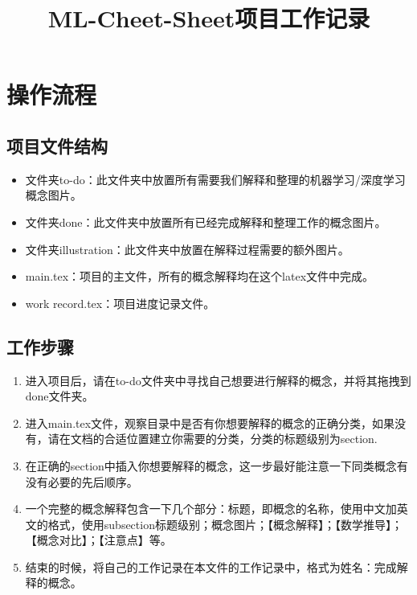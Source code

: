 \documentclass[a4paper,12pt]{article}
\title{ML-Cheet-Sheet项目工作记录}
\begin{document}
\maketitle

\section{操作流程}
\subsection{项目文件结构}
\begin{itemize}
    \item 文件夹to-do：此文件夹中放置所有需要我们解释和整理的机器学习/深度学习概念图片。
    \item 文件夹done：此文件夹中放置所有已经完成解释和整理工作的概念图片。
    \item 文件夹illustration：此文件夹中放置在解释过程需要的额外图片。
    \item main.tex：项目的主文件，所有的概念解释均在这个latex文件中完成。
    \item work record.tex：项目进度记录文件。
\end{itemize}

\subsection{工作步骤}
\begin{enumerate}
    \item 进入项目后，请在to-do文件夹中寻找自己想要进行解释的概念，并将其拖拽到done文件夹。
    \item 进入main.tex文件，观察目录中是否有你想要解释的概念的正确分类，如果没有，请在文档的合适位置建立你需要的分类，分类的标题级别为section.
    \item 在正确的section中插入你想要解释的概念，这一步最好能注意一下同类概念有没有必要的先后顺序。
    \item 一个完整的概念解释包含一下几个部分：标题，即概念的名称，使用中文加英文的格式，使用subsection标题级别；概念图片；【概念解释】；【数学推导】；【概念对比】；【注意点】等。
    \item 结束的时候，将自己的工作记录在本文件的工作记录中，格式为姓名：完成解释的概念。
\end{enumerate}
\end{document}
